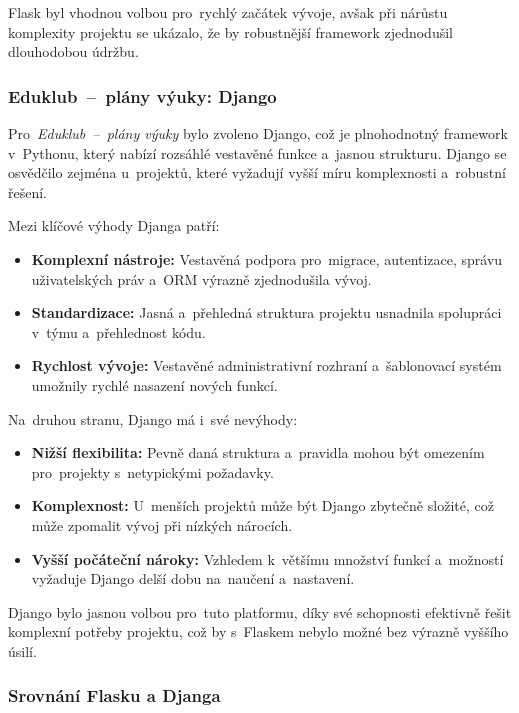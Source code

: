 \documentclass[male,czech,api_bc]{kitheses}
\begin{document}
Flask byl vhodnou volbou pro~rychlý začátek vývoje, avšak při nárůstu komplexity projektu se ukázalo, že by robustnější framework zjednodušil dlouhodobou údržbu.

\subsubsection{Eduklub~--~plány výuky: Django}

Pro~\textit{Eduklub~--~plány výuky} bylo zvoleno Django, což je plnohodnotný framework v~Pythonu, který nabízí rozsáhlé vestavěné funkce a~jasnou strukturu. Django se osvědčilo zejména u~projektů, které vyžadují vyšší míru komplexnosti a~robustní řešení.

Mezi klíčové výhody Djanga patří:
\begin{itemize}
	\item \textbf{Komplexní nástroje:} Vestavěná podpora pro~migrace, autentizace, správu uživatelských práv a~ORM výrazně zjednodušila vývoj.
	\item \textbf{Standardizace:} Jasná a~přehledná struktura projektu usnadnila spolupráci v~týmu a~přehlednost kódu.
	\item \textbf{Rychlost vývoje:} Vestavěné administrativní rozhraní a~šablonovací systém umožnily rychlé nasazení nových funkcí.
\end{itemize}

Na~druhou stranu, Django má i~své nevýhody:
\begin{itemize}
	\item \textbf{Nižší flexibilita:} Pevně daná struktura a~pravidla mohou být omezením pro~projekty s~netypickými požadavky.
	\item \textbf{Komplexnost:} U~menších projektů může být Django zbytečně složité, což může zpomalit vývoj při nízkých nárocích.
	\item \textbf{Vyšší počáteční nároky:} Vzhledem k~většímu množství funkcí a~možností vyžaduje Django delší dobu na~naučení a~nastavení.
\end{itemize}

Django bylo jasnou volbou pro~tuto platformu, díky své schopnosti efektivně řešit komplexní potřeby projektu, což by s~Flaskem nebylo možné bez výrazně vyššího úsilí.

\newpage

\subsubsection{Srovnání Flasku a Djanga}
\end{document}
